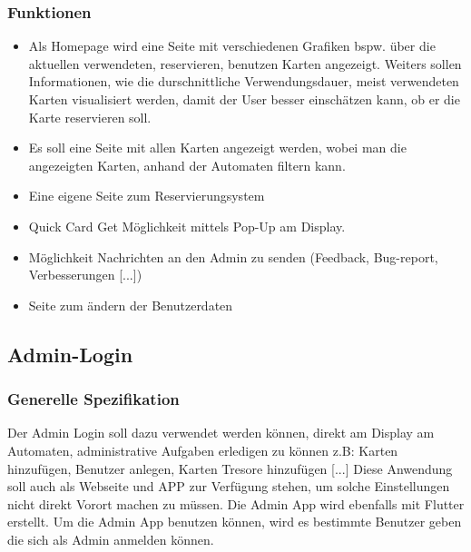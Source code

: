 \documentclass[a4paper]{article}
\begin{document}
\subsubsection{Funktionen}
\begin{itemize}
  \item Als Homepage wird eine Seite mit verschiedenen Grafiken bspw. über die aktuellen verwendeten, reservieren, benutzen Karten angezeigt. Weiters sollen Informationen, wie die durschnittliche Verwendungsdauer, meist verwendeten Karten visualisiert werden, damit der User besser einschätzen kann, ob er die Karte reservieren soll.
  \item Es soll eine Seite mit allen Karten angezeigt werden, wobei man die angezeigten Karten, anhand der Automaten filtern kann.
  \item Eine eigene Seite zum Reservierungsystem
  \item Quick Card Get Möglichkeit mittels Pop-Up am Display.
  \item Möglichkeit Nachrichten an den Admin zu senden (Feedback, Bug-report, Verbesserungen [...])
  \item Seite zum \"andern der Benutzerdaten
\end{itemize}

\subsection{Admin-Login}
\subsubsection{Generelle Spezifikation}
Der Admin Login soll dazu verwendet werden können, direkt am Display am Automaten, administrative Aufgaben erledigen zu können z.B: Karten hinzufügen, Benutzer anlegen, Karten Tresore hinzufügen [...] Diese Anwendung soll auch als Webseite und APP zur Verfügung stehen, um solche Einstellungen nicht direkt Vorort machen zu müssen. Die Admin App wird ebenfalls mit Flutter erstellt. Um die Admin App benutzen können, wird es bestimmte Benutzer geben die sich als Admin anmelden können. 
\end{document}
